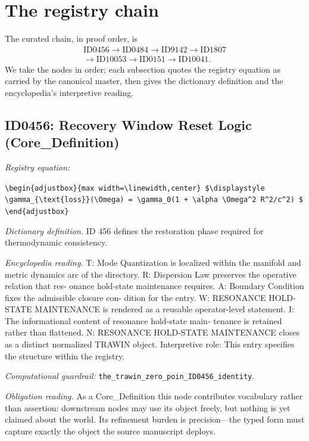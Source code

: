 \documentclass[11pt]{article}
\theoremstyle{remark}
\begin{document}
\section{The registry chain}
\label{sec:chain}

The curated chain, in proof order, is
\begin{equation*}
\begin{gathered}
\text{ID0456} \to \text{ID0484} \to \text{ID9142} \to \text{ID1807} \\
\to \text{ID10053} \to \text{ID0151} \to \text{ID10041}.
\end{gathered}
\end{equation*}
We take the nodes in order; each subsection quotes the registry equation as carried by the canonical master, then gives the dictionary definition and the encyclopedia's interpretive reading.

\subsection{ID0456: Recovery Window Reset Logic (Core\_Definition)}

\noindent\textit{Registry equation:}\par
{\small\texttt{\textbackslash{}begin\{adjustbox\}\{max width=\textbackslash{}linewidth,center\} \$\textbackslash{}displaystyle \textbackslash{}gamma\_\{\textbackslash{}text\{loss\}\}(\textbackslash{}Omega) = \textbackslash{}gamma\_0(1 + \textbackslash{}alpha \textbackslash{}Omega\textasciicircum{}2 R\textasciicircum{}2/c\textasciicircum{}2) \$ \textbackslash{}end\{adjustbox\}}}\par\medskip
\noindent\textit{Dictionary definition.} ID 456 defines the restoration phase required for thermodynamic consistency.\par\medskip
\noindent\textit{Encyclopedia reading.} T: Mode Quantization is localized within the manifold and metric dynamics arc of the directory. R: Dispersion Law preserves the operative relation that res- onance hold-state maintenance requires. A: Boundary Condition fixes the admissible closure con- dition for the entry. W: RESONANCE HOLD-STATE MAINTENANCE is rendered as a reusable operator-level statement. I: The informational content of resonance hold-state main- tenance is retained rather than flattened. N: RESONANCE HOLD-STATE MAINTENANCE closes as a distinct normalized TRAWIN object. Interpretive role: This entry specifies the structure within the registry.
\par\medskip\noindent\textit{Computational guardrail:} \texttt{the\_trawin\_zero\_poin\_ID0456\_identity}.
\par\medskip\noindent\textit{Obligation reading.} As a Core\_Definition this node contributes vocabulary rather than assertion: downstream nodes may use its object freely, but nothing is yet claimed about the world. Its refinement burden is precision---the typed form must capture exactly the object the source manuscript deploys.
\end{document}
